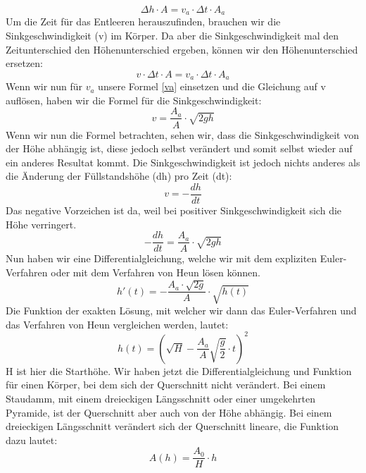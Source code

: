 \documentclass[a4paper,12pt]{report}
\begin{document}
\begin{equation}
\Delta h \cdot A = v_a \cdot \Delta t \cdot A_a
\end{equation} 
Um die Zeit für das Entleeren herauszufinden, brauchen wir die Sinkgeschwindigkeit (v) im Körper. Da aber die Sinkgeschwindigkeit mal den Zeitunterschied den Höhenunterschied ergeben, können wir den Höhenunterschied ersetzen:
\begin{equation}
v \cdot \Delta t \cdot A = v_a \cdot \Delta t \cdot A_a
\end{equation} 
Wenn wir nun für $v_a$ unsere Formel \ref{va} einsetzen und die Gleichung auf v auflösen, haben wir die Formel für die Sinkgeschwindigkeit:
\begin{equation}
v = \frac{A_a}{A} \cdot \sqrt{2gh}
\end{equation} 
Wenn wir nun die Formel betrachten, sehen wir, dass die Sinkgeschwindigkeit von der Höhe abhängig ist, diese jedoch selbst verändert und somit selbst wieder auf ein anderes Resultat kommt. Die Sinkgeschwindigkeit ist jedoch nichts anderes als die Änderung der Füllstandshöhe (dh) pro Zeit (dt): 
\begin{equation}
v = - \frac{dh}{dt}
\end{equation} 
Das negative Vorzeichen ist da, weil bei positiver Sinkgeschwindigkeit sich die Höhe verringert. 
\begin{equation}
- \frac{dh}{dt} = \frac{A_a}{A} \cdot \sqrt{2gh}
\end{equation} 
Nun haben wir eine Differentialgleichung, welche wir mit dem expliziten Euler-Verfahren oder mit dem Verfahren von Heun lösen können. 
\begin{equation} \label{dd}
 h'(t)=- \frac{A_a \cdot  \sqrt{2g}}{A} \cdot \sqrt{h(t)}
\end{equation}
Die Funktion der exakten Lösung, mit welcher wir dann das Euler-Verfahren und das Verfahren von Heun vergleichen werden, lautet: 
\begin{equation}
h(t) = \left( \sqrt{H} - \frac{A_a}{A} \sqrt{\frac{g}{2}} \cdot t \right)^2
\end{equation}
H ist hier die Starthöhe. Wir haben jetzt die Differentialgleichung und Funktion für einen Körper, bei dem sich der Querschnitt nicht verändert. Bei einem Staudamm, mit einem dreieckigen Längsschnitt oder einer umgekehrten Pyramide, ist der Querschnitt aber auch von der Höhe abhängig. Bei einem dreieckigen Längsschnitt verändert sich der Querschnitt lineare, die Funktion dazu lautet:
\begin{equation}
A(h) = \frac{A_0}{H} \cdot h 
\end{equation} 
\end{document}
